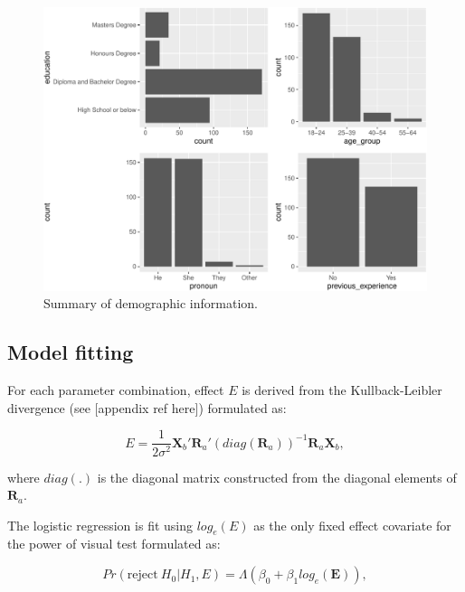 \documentclass[]{interact}
\theoremstyle{plain}%
\theoremstyle{definition}
\theoremstyle{remark}
\begin{document}
\begin{figure}
\includegraphics[width=1\linewidth]{paper_comparison_files/figure-latex/demographic-summary-plot-1} \caption{Summary of demographic information. \label{fig:demographic-summary-plot}}\label{fig:demographic-summary-plot}
\end{figure}

\hypertarget{model-fitting}{%
\subsection{Model fitting}\label{model-fitting}}

For each parameter combination, effect \(E\) is derived from the
Kullback-Leibler divergence (see {[}appendix ref here{]}) formulated as:

\begin{equation} \label{eq:effect-size-ex1}
E = \frac{1}{2\sigma^2}\boldsymbol{X}_b'\boldsymbol{R}_a'(diag(\boldsymbol{R}_a))^{-1}\boldsymbol{R}_a\boldsymbol{X}_b,
\end{equation}

where \(diag(.)\) is the diagonal matrix constructed from the diagonal
elements of \(\boldsymbol{R}_a\).

The logistic regression is fit using \(log_e(E)\) as the only fixed
effect covariate for the power of visual test formulated as:

\begin{equation} \label{eq:logistic-regression-1-1}
Pr(\text{reject}~H_0|H_1,E) = \Lambda(\beta_0 + \beta_1 log_e(\boldsymbol{E})),
\end{equation}
\end{document}
